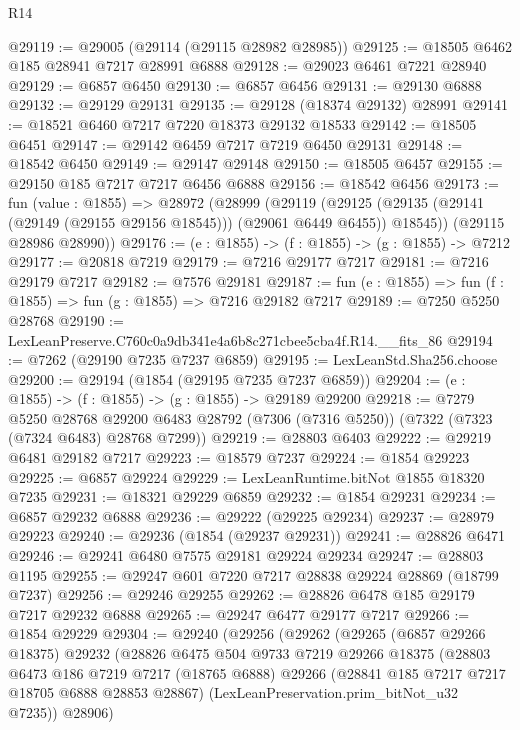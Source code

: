 \begin{lexlean}{R14}
\begin{coremodule}
@29119 := @29005 (@29114 (@29115 @28982 @28985))
@29125 := @18505 @6462 @185 @28941 @7217 @28991 @6888
@29128 := @29023 @6461 @7221 @28940
@29129 := @6857 @6450
@29130 := @6857 @6456
@29131 := @29130 @6888
@29132 := @29129 @29131
@29135 := @29128 (@18374 @29132) @28991
@29141 := @18521 @6460 @7217 @7220 @18373 @29132 @18533
@29142 := @18505 @6451
@29147 := @29142 @6459 @7217 @7219 @6450 @29131
@29148 := @18542 @6450
@29149 := @29147 @29148
@29150 := @18505 @6457
@29155 := @29150 @185 @7217 @7217 @6456 @6888
@29156 := @18542 @6456
@29173 := fun (value : @1855) =>
  @28972
    (@28999
      (@29119
        (@29125 (@29135 (@29141 (@29149 (@29155 @29156 @18545))) (@29061 @6449 @6455)) @18545))
      (@29115 @28986 @28990))
@29176 := (e : @1855) -> (f : @1855) -> (g : @1855) -> @7212
@29177 := @20818 @7219
@29179 := @7216 @29177 @7217
@29181 := @7216 @29179 @7217
@29182 := @7576 @29181
@29187 := fun (e : @1855) => fun (f : @1855) => fun (g : @1855) => @7216 @29182 @7217
@29189 := @7250 @5250 @28768
@29190 := LexLeanPreserve.C760c0a9db341e4a6b8c271cbee5cba4f.R14.__fits_86
@29194 := @7262 (@29190 @7235 @7237 @6859)
@29195 := LexLeanStd.Sha256.choose
@29200 := @29194 (@1854 (@29195 @7235 @7237 @6859))
@29204 := (e : @1855) -> (f : @1855) -> (g : @1855) -> @29189 @29200
@29218 := @7279
    @5250
    @28768
    @29200
    @6483
    @28792
    (@7306 (@7316 @5250))
    (@7322 (@7323 (@7324 @6483) @28768 @7299))
@29219 := @28803 @6403
@29222 := @29219 @6481 @29182 @7217
@29223 := @18579 @7237
@29224 := @1854 @29223
@29225 := @6857 @29224
@29229 := LexLeanRuntime.bitNot @1855 @18320 @7235
@29231 := @18321 @29229 @6859
@29232 := @1854 @29231
@29234 := @6857 @29232 @6888
@29236 := @29222 (@29225 @29234)
@29237 := @28979 @29223
@29240 := @29236 (@1854 (@29237 @29231))
@29241 := @28826 @6471
@29246 := @29241 @6480 @7575 @29181 @29224 @29234
@29247 := @28803 @1195
@29255 := @29247 @601 @7220 @7217 @28838 @29224 @28869 (@18799 @7237)
@29256 := @29246 @29255
@29262 := @28826 @6478 @185 @29179 @7217 @29232 @6888
@29265 := @29247 @6477 @29177 @7217
@29266 := @1854 @29229
@29304 := @29240
    (@29256
      (@29262
        (@29265
          (@6857 @29266 @18375)
          @29232
          (@28826
            @6475
            @504
            @9733
            @7219
            @29266
            @18375
            (@28803
              @6473
              @186
              @7219
              @7217
              (@18765 @6888)
              @29266
              (@28841 @185 @7217 @7217 @18705 @6888 @28853 @28867)
              (LexLeanPreservation.prim_bitNot_u32 @7235))
            @28906)

\end{coremodule}
\end{lexlean}
